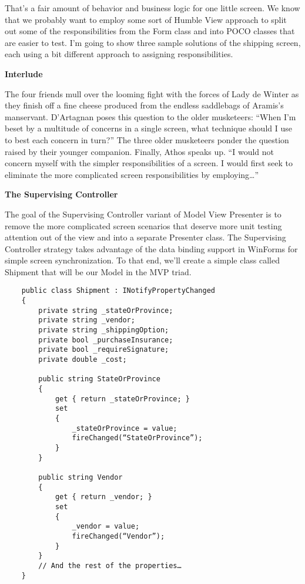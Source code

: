 \documentclass{article}
\begin{document}
{That's a fair amount of behavior and business logic for one little screen.  We know that we probably want to employ some sort of Humble View approach to split out some of the responsibilities from the Form class and into POCO classes that are easier to test.  I'm going to show three sample solutions of the shipping screen, each using a bit different approach to assigning responsibilities.
 
\Large {\textbf{Interlude}}

The four friends mull over the looming fight with the forces of Lady de Winter as they finish off a fine cheese produced from the endless saddlebags of Aramis's manservant.  D'Artagnan  poses this question to the older musketeers:  “When I'm beset by a multitude of concerns in a single screen, what technique should I use to best each concern in turn?”  The three older musketeers ponder the question raised by their younger companion.  Finally, Athos speaks up.  “I would not concern myself with the simpler responsibilities of a screen.  I would first seek to eliminate the more complicated screen responsibilities by employing…”

 \newpage
\Large {\textbf{The Supervising Controller}}

The goal of the Supervising Controller variant of Model View Presenter is to remove the more complicated screen scenarios that deserve more unit testing attention out of the view and into a separate Presenter class.  The Supervising Controller strategy takes advantage of the data binding support in WinForms for simple screen synchronization.  To that end, we'll create a simple class called Shipment that will be our Model in the MVP triad. 

\begin{lstlisting}
    public class Shipment : INotifyPropertyChanged
    {
        private string _stateOrProvince;
        private string _vendor;
        private string _shippingOption;
        private bool _purchaseInsurance;
        private bool _requireSignature;
        private double _cost; 

        public string StateOrProvince
        {
            get { return _stateOrProvince; }
            set
            {
                _stateOrProvince = value;
                fireChanged(“StateOrProvince”);
            }
        } 

        public string Vendor
        {
            get { return _vendor; }
            set
            {
                _vendor = value;
                fireChanged(“Vendor”);
            }
        }
        // And the rest of the properties…
	}
\end{lstlisting}	

}
\end{document}
